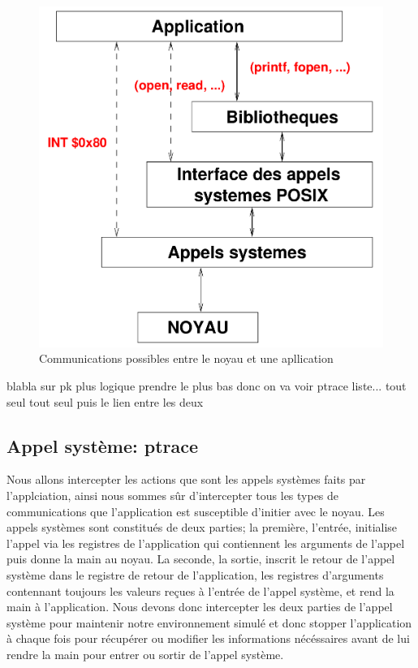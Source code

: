 \begin{figure}[H]
 \centering
 \includegraphics[scale=0.20]{Pictures/Communication_application_noyau.png}
 \caption{Communications possibles entre le noyau et une apllication}
 \label{AS_Communication}
\end{figure}


blabla sur pk plus logique prendre le plus bas donc on va voir ptrace
 liste... tout seul tout seul puis le lien entre
les deux
\subsection{Appel système: ptrace}
Nous allons intercepter les actions que sont les appels systèmes faits par
l'applciation, ainsi nous sommes sûr d'intercepter tous les types de
communications que l'application est susceptible d'initier avec le noyau. Les
appels systèmes sont constitués de deux parties; la première, l'entrée,
initialise l'appel via les registres de l'application qui contiennent les
arguments de l'appel puis donne la main au noyau. La seconde, la sortie, inscrit
le retour de l'appel système dans le registre de retour de l'application, les
registres d'arguments contennant toujours les valeurs reçues à l'entrée de
l'appel système, et rend la main à l'application. Nous devons donc intercepter
les deux parties de l'appel système pour maintenir notre environnement simulé et
donc stopper l'application à chaque fois pour récupérer ou modifier les
informations nécéssaires avant de lui rendre la main pour entrer ou sortir de
l'appel système.

